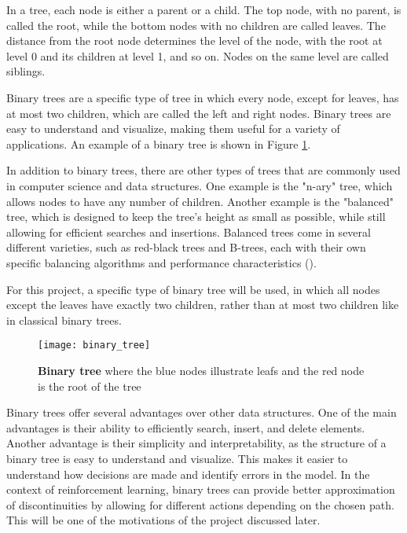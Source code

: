 In a tree, each node is either a parent or a child. The top node, with no parent, is called the root, while the bottom nodes with no children are called leaves. The distance from the root node determines the level of the node, with the root at level 0 and its children at level 1, and so on. Nodes on the same level are called siblings.

Binary trees are a specific type of tree in which every node, except for leaves, has at most two children, which are called the left and right nodes. Binary trees are easy to understand and visualize, making them useful for a variety of applications. An example of a binary tree is shown in Figure \ref{fig:binary_tree}.

In addition to binary trees, there are other types of trees that are commonly used in computer science and data structures. One example is the "n-ary" tree, which allows nodes to have any number of children. Another example is the "balanced" tree, which is designed to keep the tree's height as small as possible, while still allowing for efficient searches and insertions. Balanced trees come in several different varieties, such as red-black trees and B-trees, each with their own specific balancing algorithms and performance characteristics (\cite{goodrich_data_nodate}).

For this project, a specific type of binary tree will be used, in which all nodes except the leaves have exactly two children, rather than at most two children like in classical binary trees.

\begin{figure}[!ht]
\centering
\texttt{[image: binary\_tree]}
\caption[Binary tree]{
  \textbf{Binary tree} where the blue nodes illustrate leafs and the red node is the root of the tree
  }
\label{fig:binary_tree}
\end{figure}

Binary trees offer several advantages over other data structures. One of the main advantages is their ability to efficiently search, insert, and delete elements. Another advantage is their simplicity and interpretability, as the structure of a binary tree is easy to understand and visualize. This makes it easier to understand how decisions are made and identify errors in the model. In the context of reinforcement learning, binary trees can provide better approximation of discontinuities by allowing for different actions depending on the chosen path. This will be one of the motivations of the project discussed later.

